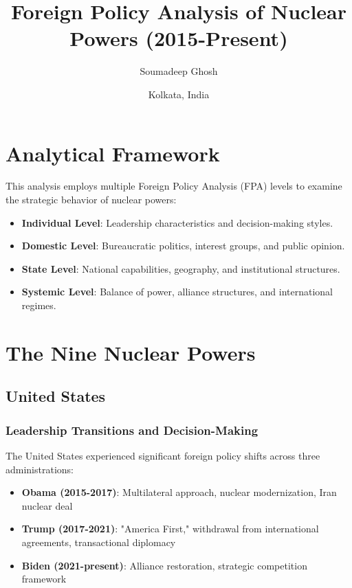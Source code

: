 \documentclass[a4paper, 11pt]{article}
\title{\textbf{Foreign Policy Analysis of Nuclear Powers (2015-Present)}}
\author{Soumadeep Ghosh}
\date{Kolkata, India}
\begin{document}
\maketitle

\section{Analytical Framework}

This analysis employs multiple Foreign Policy Analysis (FPA) levels to examine the strategic behavior of nuclear powers:

\begin{itemize}
	\item \textbf{Individual Level}: Leadership characteristics and decision-making styles.
	\item \textbf{Domestic Level}: Bureaucratic politics, interest groups, and public opinion.
	\item \textbf{State Level}: National capabilities, geography, and institutional structures.
	\item \textbf{Systemic Level}: Balance of power, alliance structures, and international regimes.
\end{itemize}

\section{The Nine Nuclear Powers}

\subsection{United States}

\subsubsection{Leadership Transitions and Decision-Making}
The United States experienced significant foreign policy shifts across three administrations:
\begin{itemize}
	\item \textbf{Obama (2015-2017)}: Multilateral approach, nuclear modernization, Iran nuclear deal
	\item \textbf{Trump (2017-2021)}: "America First," withdrawal from international agreements, transactional diplomacy
	\item \textbf{Biden (2021-present)}: Alliance restoration, strategic competition framework
\end{itemize}
\end{document}
